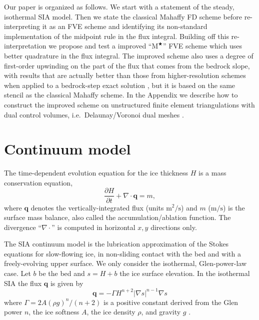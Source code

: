 \documentclass[twocolumn,letterpaper]{igs}
\newcommand\bq{\mathbf{q}}
\newcommand{\Div}{\nabla\cdot}
\newcommand{\grad}{\nabla}
\newcommand{\Mstar}{$\text{M}^{\bigstar}$\xspace}
\begin{document}
Our paper is organized as follows.  We start with a statement of the steady, isothermal SIA model.  Then we state the classical Mahaffy FD scheme before re-interpreting it as an FVE scheme and identifying its non-standard implementation of the midpoint rule in the flux integral.  Building off this re-interpretation we propose and test a improved ``\Mstar'' FVE scheme which uses better quadrature in the flux integral.  The improved scheme also uses a degree of first-order upwinding on the part of the flux that comes from the bedrock slope, with results that are actually better than those from higher-resolution schemes when applied to a bedrock-step exact solution \citep{JaroschSchoofAnslow2013}, but it is based on the same stencil as the classical Mahaffy scheme.   In the Appendix we describe how to construct the improved scheme on unstructured finite element triangulations with dual control volumes, i.e.~Delaunay/Voronoi dual meshes \citep{EgholmNielsen2010,Ringleretal2013}.

\section*{Continuum model}

The time-dependent evolution equation for the ice thickness $H$ is a mass conservation equation,
\begin{equation}
\frac{\partial H}{\partial t} + \Div \bq = m,  \label{eq:siaevolution}
\end{equation}
where $\bq$ denotes the vertically-integrated flux (units $\text{m}^2/\text{s}$) and $m$ ($\text{m}/\text{s}$) is the surface mass balance, also called the accumulation/ablation function.  The divergence ``$\Div$'' is computed in horizontal $x,y$ directions only.

The SIA continuum model is the lubrication approximation \citep{Fowler1997} of the Stokes equations for slow-flowing ice, in non-sliding contact with the bed and with a freely-evolving upper surface.  We only consider the isothermal, Glen-power-law \citep{GreveBlatter2009} case.  Let $b$ be the bed and $s = H+b$ the ice surface elevation.  In the isothermal SIA the flux $\bq$ is given by
\begin{equation}
\bq = - \Gamma H^{n+2} |\grad s|^{n-1} \grad s  \label{eq:siaflux}
\end{equation}
where $\Gamma = 2 A (\rho g)^n / (n+2)$ is a positive constant derived from the Glen power $n$, the ice softness $A$, the ice density $\rho$, and gravity $g$ \citep{Bueleretal2005}.
\end{document}
